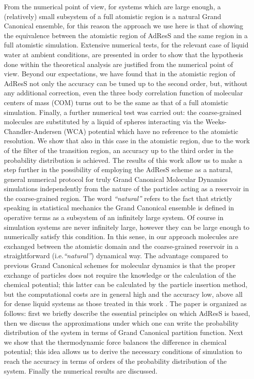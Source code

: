 \documentclass[aps,a4paper,reprint,onecolumn]{revtex4}
\begin{document}
From the numerical point of view, for systems which are large enough, a (relatively) small subsystem of a full atomistic region is a 
natural Grand Canonical ensemble, for this reason the approach we use here is that of showing the equivalence between the atomistic region of AdResS and the same region in a full atomistic simulation.
Extensive numerical tests, for the relevant case of liquid water at ambient conditions, are presented in order to show that the hypothesis done within the theoretical analysis are justified from the numerical point of view. Beyond our expectations, we have found that in the atomistic region of AdResS not only the accuracy can be tuned up to the second order, but, without any additional correction, even the three body correlation function of molecular centers of mass (COM) turns out to be the same as that of a full atomistic simulation. Finally, a further numerical test was carried out: the coarse-grained molecules are substituted by a liquid of spheres interacting via the Weeks-Chandler-Andersen (WCA)  potential \cite{wca} which have no reference to the atomistic resolution. We show that also in this case in the atomistic region, due to the work of the filter of the transition region, an accuracy up to the third order in the probability distribution is achieved.
The results of this work allow us to make a step further in the possibility of employing the AdResS scheme as a natural, general numerical protocol for truly Grand Canonical Molecular Dynamics simulations
independently from the nature of the particles acting as a reservoir in the coarse-grained region. The word {\it ``natural''} refers to the fact  that strictly speaking in statistical mechanics the Grand Canonical ensemble is defined in operative terms as a subsystem of an infinitely large system. Of course in simulation systems are never infinitely large, however they can be large enough to numerically satisfy this condition. 
In this sense, in our approach molecules are exchanged between the atomistic domain and the coarse-grained reservoir in a straightforward (i.e.{\it ``natural''}) dynamical way. The advantage compared to previous Grand Canonical schemes for molecular dynamics is that the proper exchange of particles does not require the knowledge or the calculation of the chemical potential; this latter can be calculated by the particle insertion method, but the computational costs are in general high and the accuracy low, above all for dense liquid systems as those treated in this work \cite{pet1,pet2,pet3,pet4,pet5,flo}. 
The paper is organized as follows: first we briefly describe the essential principles on which AdResS is based, then we discuss the approximations under which one can write the probability distribution of the system in terms of Grand Canonical partition function. Next we show that the thermodynamic force balances the difference in chemical potential; this idea allows us to derive the necessary conditions of simulation to reach the accuracy in terms of orders of the probability distribution of the system. 
Finally the numerical results are discussed.
\end{document}
